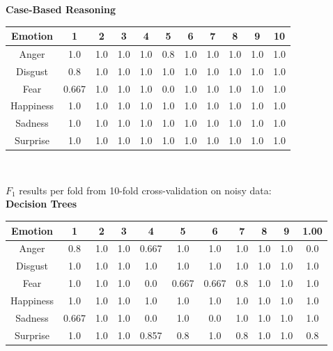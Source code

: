 \documentclass[a4paper]{article}
\begin{document}
  {\bf Case-Based Reasoning}\\

\begin{center}
  \begin{tabular}{|c|cccccccccc|}
  \hline
    Emotion & 1 & 2 & 3 & 4 & 5 & 6 & 7 & 8 & 9 & 10 \\
    \hline
    Anger 	& 1.0 & 1.0 & 1.0 & 1.0 & 0.8 & 1.0 & 1.0 & 1.0 & 1.0 & 1.0 \\
	Disgust & 0.8 & 1.0 & 1.0 & 1.0 & 1.0 & 1.0 & 1.0 & 1.0 & 1.0 & 1.0 \\
	Fear 	& 0.667 & 1.0 & 1.0 & 1.0 & 0.0 & 1.0 & 1.0 & 1.0 & 1.0 & 1.0 \\
	Happiness 	& 1.0 & 1.0 & 1.0 & 1.0 & 1.0 & 1.0 & 1.0 & 1.0 & 1.0 & 1.0 \\
	Sadness 	& 1.0 & 1.0 & 1.0 & 1.0 & 1.0 & 1.0 & 1.0 & 1.0 & 1.0 & 1.0 \\
	Surprise 	& 1.0 & 1.0 & 1.0 & 1.0 & 1.0 & 1.0 & 1.0 & 1.0 & 1.0 & 1.0 \\
	\hline
  \end{tabular}\\
  \end{center}

$F_1$ results per fold from 10-fold cross-validation on noisy data:\\
  
{\bf Decision Trees}\\

\begin{center}
  \begin{tabular}{|c|cccccccccc|}
  \hline
    Emotion & 1 & 2 & 3 & 4 & 5 & 6 & 7 & 8 & 9 & 1.00 \\
    \hline
    Anger & 0.8 & 1.0 & 1.0 & 0.667 & 1.0 & 1.0 & 1.0 & 1.0 & 1.0 &0.0\\
Disgust   & 1.0 & 1.0 & 1.0 & 1.0 & 1.0 & 1.0 & 1.0 & 1.0 & 1.0 & 1.0 \\
Fear & 1.0 & 1.0 & 1.0 &0.0& 0.667 & 0.667 & 0.8 & 1.0 & 1.0 & 1.0 \\
Happiness & 1.0 & 1.0 & 1.0 & 1.0 & 1.0 & 1.0 & 1.0 & 1.0 & 1.0 & 1.0 \\
Sadness & 0.667 & 1.0 & 1.0 &0.0& 1.0 &0.0& 1.0 & 1.0 & 1.0 & 1.0 \\
Surprise & 1.0 & 1.0 & 1.0 & 0.857 & 0.8 & 1.0 & 0.8 & 1.0 & 1.0 & 0.8 \\
	\hline
  \end{tabular}\\
  \end{center} 
  
\end{document}
